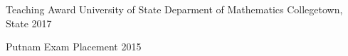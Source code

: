 


\begin{cvshortentries}

  \cvhonor
    {Teaching Award} %
    {University of State Deparment of Mathematics} %
    {Collegetown, State} %
    {2017} %
\end{cvshortentries}




\begin{cvshortentries}

  \cvhonor
    {Putnam Exam} %
    {Placement} %
    {} %
    {2015} %

\end{cvshortentries}

